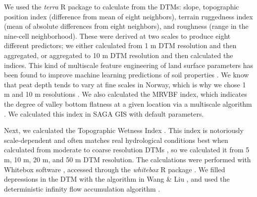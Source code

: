 \documentclass[soil, manuscript]{copernicus}
\begin{document}
We used the \emph{terra} R package to calculate from the DTMs: slope, topographic position index (difference from mean of eight neighbors), terrain ruggedness index (mean of absolute differences from eight neighbors), and roughness (range in the nine-cell neighborhood).
These were derived at two scales to produce eight different predictors; we either calculated from 1 m DTM resolution and then aggregated, or aggregated to 10 m DTM resolution and then calculated the indices.
This kind of multiscale feature engineering of land surface parameters has been found to improve machine learning predictions of soil properties \citep{millerImpactMultiscalePredictor2015, dornikOptimalScalingPredictors2022, newmanAssessingSpatiallyHeterogeneous2023}.
We know that peat depth tends to vary at fine scales in Norway, which is why we chose 1 m and 10 m resolutions \citep{maxwellLandsurfaceParametersSpatial2022}.
We also calculated the MRVBF index, which indicates the degree of valley bottom flatness at a given location via a multiscale algorithm \citep{gallantMultiresolutionIndexValley2003}.
We calculated this index in SAGA GIS \citep[v.9.3.2,][]{conradSystemAutomatedGeoscientific2015} with default parameters.

Next, we calculated the Topographic Wetness Index \citep{quinnPredictionHillslopeFlow1991}.
This index is notoriously scale-dependent and often matches real hydrological conditions best when calculated from moderate to coarse resolution DTMs \citep{agrenEvaluatingDigitalTerrain2014, riihimakiTopographicWetnessIndex2021}, so we calculated it from 5 m, 10 m, 20 m, and 50 m DTM resolution.
The calculations were performed with Whitebox software \citep{lindsayWhiteboxGATCase2016}, accessed through the \emph{whitebox} R package \citep[v2.4,][]{wuWhiteboxWhiteboxToolsFrontend2022}.
We filled depressions in the DTM with the algorithm in Wang \& Liu \citeyearpar{wangEfficientMethodIdentifying2006}, and used the deterministic infinity flow accumulation algorithm \citep{tarbotonNewMethodDetermination1997}.
\end{document}
